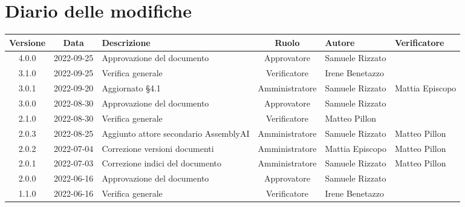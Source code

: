 \section*{Diario delle modifiche}
	\begin{center}
	\renewcommand{\arraystretch}{1.8} %
	\begin{longtable}{ |c|c|p{8em}|c|m{5em}|m{5em}| }
	\hline
	\textbf{Versione} & \textbf{Data} & \textbf{Descrizione} &  \textbf{Ruolo} &  \textbf{Autore} & \textbf{Verificatore}\\ %
	\hline
	4.0.0& 2022-09-25 & Approvazione del documento & Approvatore & Samuele \newline Rizzato & \\
	\hline
	3.1.0& 2022-09-25 & Verifica generale & Verificatore & Irene \newline Benetazzo & \\
	\hline
	3.0.1& 2022-09-20 & Aggiornato §4.1 & Amministratore & Samuele \newline Rizzato & Mattia \newline Episcopo \\
	\hline
	3.0.0& 2022-08-30 & Approvazione del documento & Approvatore & Samuele \newline Rizzato & \\
	\hline
	2.1.0& 2022-08-30 & Verifica generale & Verificatore & Matteo \newline Pillon & \\
	\hline
	2.0.3& 2022-08-25 & Aggiunto attore secondario AssemblyAI & Amministratore & Samuele \newline Rizzato & Matteo \newline Pillon\\
	\hline
	2.0.2& 2022-07-04 & Correzione versioni documenti & Amministratore & Mattia \newline Episcopo & Matteo \newline Pillon\\
	\hline
	2.0.1 & 2022-07-03 & Correzione indici del documento & Amministratore & Samuele \newline Rizzato & Matteo \newline Pillon\\
	\hline
	2.0.0 & 2022-06-16 & Approvazione del documento & Approvatore & Samuele \newline Rizzato & \\
	\hline
	1.1.0 & 2022-06-16 & Verifica generale & Verificatore & Irene \newline Benetazzo & \\

\end{longtable}
\end{center}
